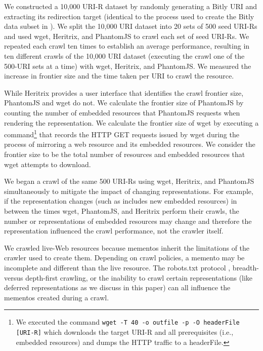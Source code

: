 \documentclass{sig-alternate}
\begin{document}
We constructed a 10,000 URI-R dataset by randomly generating a Bitly URI and extracting its redirection target (identical to the process used to create the Bitly data subset in \cite{hmotwia}). We split the 10,000 URI dataset into 20 sets of 500 seed URI-Rs and used wget, Heritrix, and PhantomJS to crawl each set of seed URI-Rs. We repeated each crawl ten times to establish an average performance, resulting in ten different crawls of the 10,000 URI dataset (executing the crawl one of the 500-URI sets at a time) with wget, Heritrix, and PhantomJS. We measured the increase in frontier size and the time taken per URI to crawl the resource. 

While Heritrix provides a user interface that identifies the crawl frontier size, PhantomJS and wget do not. We calculate the frontier size of PhantomJS by counting the number of embedded resources that PhantomJS requests when rendering the representation. We calculate the frontier size of wget by executing a command\footnote{We executed the command \texttt{wget -T 40 -o outfile -p -O headerFile [URI-R]} which downloads the target URI-R and all prerequisites (i.e., embedded resources) and dumps the HTTP traffic to a headerFile.} that records the HTTP GET requests issued by wget during the process of mirroring a web resource and its embedded resources. We consider the frontier size to be the total number of resources and embedded resources that wget attempts to download.

We began a crawl of the same 500 URI-Rs using wget, Heritrix, and PhantomJS simultaneously to mitigate the impact of changing representations. For example, if the representation changes (such as includes new embedded resources) in between the times wget, PhantomJS, and Heritrix perform their crawls, the number or representations of embedded resources may change and therefore the representation influenced the crawl performance, not the crawler itself. 

We crawled live-Web resources because mementos inherit the limitations of the crawler used to create them. Depending on crawl policies, a memento may be incomplete and different than the live resource. The robots.txt protocol \cite{robots, robotsProtocol}, breadth- versus depth-first crawling, or the inability to crawl certain representations (like deferred representations as we discuss in this paper) can all influence the mementos created during a crawl.
\end{document}
